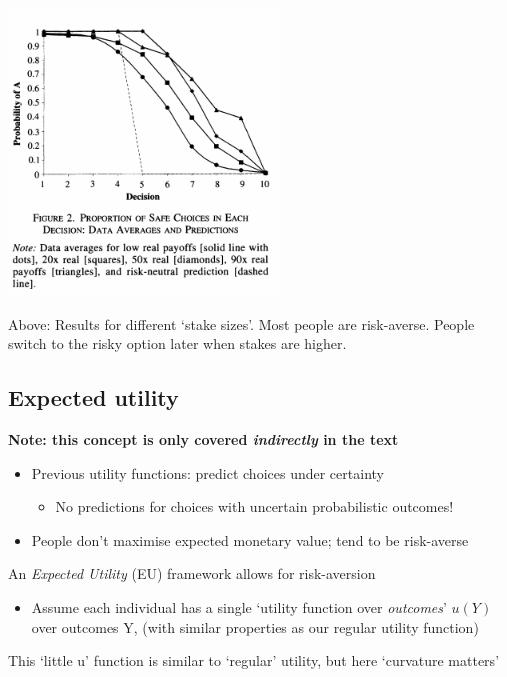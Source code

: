 \documentclass[]{article}
\providecommand{\tightlist}{%
  \setlength{\itemsep}{0pt}\setlength{\parskip}{0pt}}
\begin{document}
\includegraphics[height=3in]{picsfigs/holtlauryresults.png}

Above: Results for different `stake sizes'. Most people are risk-averse. People switch to the risky option later when stakes are higher.

\hypertarget{expected-utility}{%
\subsection{Expected utility}\label{expected-utility}}

\textbf{Note: this concept is only covered \emph{indirectly} in the text}

\begin{itemize}
\tightlist
\item
  Previous utility functions: predict choices under certainty

  \begin{itemize}
  \tightlist
  \item
    No predictions for choices with uncertain probabilistic outcomes!
  \end{itemize}
\item
  People don't maximise expected monetary value; tend to be risk-averse
\end{itemize}

An \emph{Expected Utility} (EU) framework allows for risk-aversion

\begin{itemize}
\tightlist
\item
  Assume each individual has a single `utility function over \emph{outcomes}' \(u(Y)\) over outcomes Y, (with similar properties as our regular utility function)
\end{itemize}

This `little u' function is similar to `regular' utility, but here `curvature matters'
\end{document}

